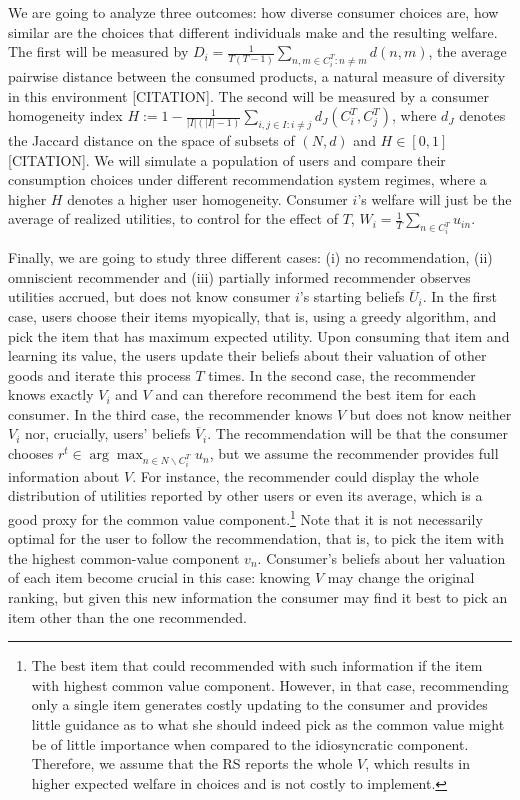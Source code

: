 \documentclass[sigconf]{acmart}
\begin{document}
We are going to analyze three outcomes: how diverse consumer choices are, how similar are the choices that different individuals make and the resulting welfare. The first will be measured by $D_i =\frac{1}{T (T-1)}\sum_{n,m \in C_i^T: n \ne m} d(n,m)$, the average pairwise distance between the consumed products, a natural measure of diversity in this environment [CITATION]. The second will be measured by a consumer homogeneity index $H:=1-\frac{1}{|I|(|I|-1)}\sum_{i,j \in I: i \ne j}d_J(C_i^T,C_j^T) $, where $d_J$ denotes the Jaccard distance on the space of subsets of $(N,d)$ and $H \in [0,1]$ [CITATION]. We will simulate a population of users and compare their consumption choices under different recommendation system regimes, where a higher $H$ denotes a higher user homogeneity. Consumer $i$'s welfare will just be the average of realized utilities, to control for the effect of $T$, $W_i=\frac{1}{T}\sum_{n \in C_i^T} u_{in}$.
\par
Finally, we are going to study three different cases: (i) no recommendation, (ii) omniscient recommender and (iii) partially informed recommender observes utilities accrued, but does not know consumer $i$'s starting beliefs $\overline U_i$. In the first case, users choose their items myopically, that is, using a greedy algorithm, and pick the item that has maximum expected utility. Upon consuming that item and learning its value, the users update their beliefs about their valuation of other goods and iterate this process $T$ times. In the second case, the recommender knows exactly $V_i$ and $V$ and can therefore recommend the best item for each consumer. In the third case, the recommender knows $V$ but does not know neither $V_i$ nor, crucially, users' beliefs $\overline V_i$. The recommendation will be that the consumer chooses $r^{t} \in \arg \max_{n \in N \backslash C_i^T} u_n$, but we assume the recommender provides full information about $V$. For instance, the recommender could display the whole distribution of utilities reported by other users or even its average, which is a good proxy for the common value component.\footnote{
The best item that could recommended with such information if the item with highest common value component. However, in that case, recommending only a single item generates costly updating to the consumer and provides little guidance as to what she should indeed pick as the common value might be of little importance when compared to the idiosyncratic component. Therefore, we assume that the RS reports the whole $V$, which results in higher expected welfare in choices and is not costly to implement.
} Note that it is not necessarily optimal for the user to follow the recommendation, that is, to pick the item with the highest common-value component $v_n$. Consumer's beliefs about her valuation of each item become crucial in this case: knowing $V$ may change the original ranking, but given this new information the consumer may find it best to pick an item other than the one recommended.
\end{document}
